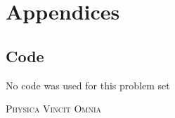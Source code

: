 \documentclass[12pt,a4paper]{article}
\begin{document}
	 
	 
	\section*{Appendices}
		\label{appendix}
	
		\subsection*{Code} 
		No code was used for this problem set
	\vfill
	\begin{center}
		{\large
		\textsc{Physica Vincit Omnia}
		}
	\end{center}
\end{document}
